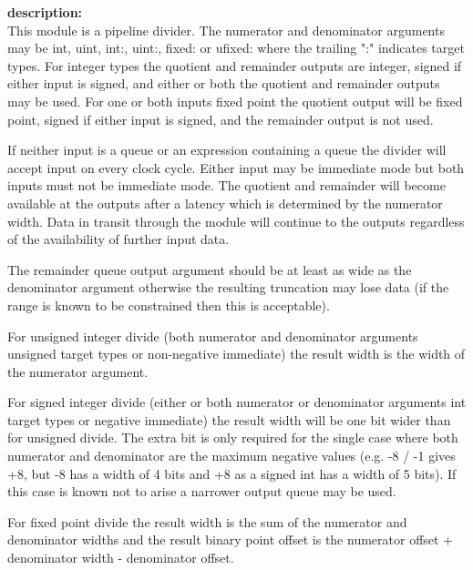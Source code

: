             {\bf description:} \\
            This module is a pipeline divider. The numerator and denominator
            arguments may be int, uint, int:, uint:, fixed: or ufixed: where the
            trailing ":" indicates target types. For integer types the quotient
            and remainder outputs are integer, signed if either input is signed,
            and either or both the quotient and remainder outputs may be used.
            For one or both inputs fixed point the quotient output will be fixed
            point, signed if either input is signed, and the remainder output
            is not used.
            
            If neither input is a queue or an expression containing a queue the
            divider will accept input on every clock cycle. Either input may be
            immediate mode but both inputs must not be immediate mode. The
            quotient and remainder will become available at the outputs after a
            latency which is determined by the numerator width. Data in transit
            through the module will continue to the outputs regardless of the
            availability of further input data.

            The remainder queue output argument should be at least as wide as the
            denominator argument otherwise the resulting truncation may lose
            data (if the range is known to be constrained then this is
            acceptable).

            For unsigned integer divide (both numerator and denominator
            arguments unsigned target types or non-negative immediate) the
            result width is the width of the numerator argument.

            For signed integer divide (either or both numerator or denominator
            arguments int target types or negative immediate) the result width
            will be one bit wider than for unsigned divide. The extra bit is
            only required for the single case where both numerator and
            denominator are the maximum negative values (e.g. -8 / -1 gives +8,
            but -8 has a width of 4 bits and +8 as a signed int has a width of 5
            bits). If this case is known not to arise a narrower output queue may
            be used.
            
            For fixed point divide the result width is the sum of the numerator
            and denominator widths and the result binary point offset is
            the numerator offset + denominator width - denominator offset.

